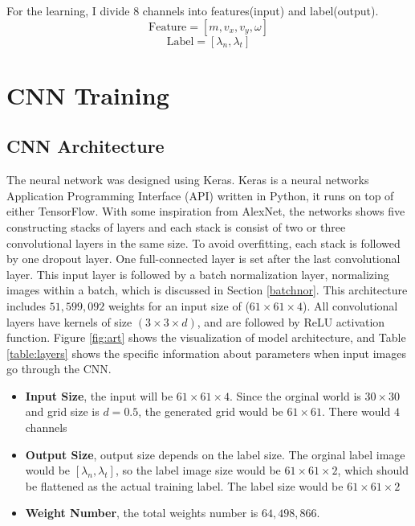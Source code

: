 For the learning, I divide 8 channels into features(input) and label(output).
    $$\text{Feature} = [m, v_x, v_y, \omega]$$
    $$\text{Label} = [\lambda_n, \lambda_t]$$


\section{CNN Training}
\subsection{CNN  Architecture}
    The neural network was designed using Keras\cite{chollet2015keras}. Keras is a neural networks Application Programming Interface (API) written in Python, it runs on top of either TensorFlow. With some inspiration from AlexNet\cite{Krizhevsky:2012:ICD:2999134.2999257}, the networks shows five constructing stacks of layers and each stack is consist of two or three convolutional layers in the same size. To avoid overfitting, each stack is followed by one dropout layer. One full-connected layer is set after the last convolutional layer. This input layer is followed by a batch normalization layer, normalizing images within a batch, which is discussed in Section \ref{batchnor}. This architecture includes $51,599,092$ weights for an input size of ($61\times61\times4$). All convolutional layers have kernels of size $(3\times 3\times d)$, and are followed by ReLU activation function. Figure \ref{fig:art} shows the visualization of model architecture, and Table \ref{table:layers} shows the specific information about parameters when input images go through the CNN.
    \begin{itemize}
        \item \textbf{Input Size}, the input will be $61\times61\times4$. Since the orginal world is $30\times30$ and grid size is $d=0.5$, the generated grid would be $61\times61$. There would $4$ channels
        \item \textbf{Output Size}, output size depends on the label size. The orginal label image would be $[\lambda_n, \lambda_t]$, so the label image size would be $61\times61\times2$, which should be flattened as the actual training label. The label size would be $61\times 61 \times 2$
        \item \textbf{Weight Number}, the total weights number is $64,498,866$. 
    \end{itemize}

